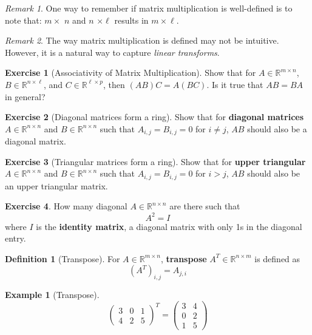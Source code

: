 \documentclass[12pt, a4paper]{article}
\newcommand{\R}{\mathbb{R}}
\theoremstyle{remark}
\newtheorem{remark}{Remark}
\theoremstyle{definition}
\newtheorem{definition}{Definition}
\newtheorem{example}{Example}
\newtheorem{exercise}{Exercise}
\numberwithin{equation}{section}
\numberwithin{definition}{section}
\numberwithin{example}{section}
\numberwithin{exercise}{section}
\numberwithin{remark}{section}
\numberwithin{figure}{section}
\begin{document}
\begin{remark}
    One way to remember if matrix multiplication is well-defined is to note that:
    $m \times$ \underline{$n$} and \underline{$n$} $\times \ell$ results in $m \times \ell$.
\end{remark}
\begin{remark}
    The way matrix multiplication is defined may not be intuitive.
    However, it is a natural way to capture \textit{linear transforms}.
\end{remark}
\begin{exercise}[Associativity of Matrix Multiplication]
    Show that for $A \in \R^{m \times n}$, $B \in \R^{n \times \ell}$, and $C \in \R^{\ell \times p}$, then $(AB)C = A(BC)$. Is it true that $AB=BA$ in general?
\end{exercise}
\begin{exercise}[Diagonal matrices form a ring]
    Show that for \textbf{diagonal matrices} $A \in \R^{n \times n}$ and $B \in \R^{n \times n}$ such that $A_{i,j} = B_{i,j} = 0$ for $i \neq j$, $AB$ should also be a diagonal matrix.
\end{exercise}
\begin{exercise}[Triangular matrices form a ring]
    Show that for \textbf{upper triangular} $A \in \R^{n \times n}$ and $B \in \R^{n \times n}$ such that $A_{i,j} = B_{i,j} = 0$ for $i > j$, $AB$ should also be an upper triangular matrix.
\end{exercise}
\begin{exercise}
    How many diagonal $A \in \R^{n \times n}$ are there such that
    \begin{equation*}
        A^2 = I
    \end{equation*}
    where $I$ is the \textbf{identity matrix}, a diagonal matrix with only 1s in the diagonal entry.
\end{exercise}
\begin{definition}[Transpose]
    For $A \in \R^{m \times n}$, \textbf{transpose} $A^T \in \R^{n \times m}$ is defined as
    \begin{equation*}
        \left( A^T \right)_{i,j} = A_{j,i}
    \end{equation*}
\end{definition}
\begin{example}[Transpose]
    \begin{equation*}
        \begin{pmatrix}
            3 & 0 & 1 \\
            4 & 2 & 5
        \end{pmatrix}^T
        =
        \begin{pmatrix}
            3 & 4 \\
            0 & 2 \\
            1 & 5
        \end{pmatrix}
    \end{equation*}
\end{example}
\end{document}
